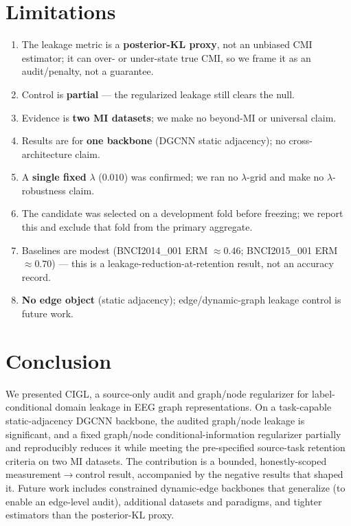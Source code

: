 \section{Limitations}

\begin{enumerate}
  \item The leakage metric is a \textbf{posterior-KL proxy}, not an unbiased CMI estimator; it can over- or
  under-state true CMI, so we frame it as an audit/penalty, not a guarantee.
  \item Control is \textbf{partial} --- the regularized leakage still clears the null.
  \item Evidence is \textbf{two MI datasets}; we make no beyond-MI or universal claim.
  \item Results are for \textbf{one backbone} (DGCNN static adjacency); no cross-architecture claim.
  \item A \textbf{single fixed} $\lambda$ ($0.010$) was confirmed; we ran no $\lambda$-grid and make no
  $\lambda$-robustness claim.
  \item The candidate was selected on a development fold before freezing; we report this and exclude that
  fold from the primary aggregate.
  \item Baselines are modest (BNCI2014\_001 ERM $\approx 0.46$; BNCI2015\_001 ERM $\approx 0.70$) --- this is
  a leakage-reduction-at-retention result, not an accuracy record.
  \item \textbf{No edge object} (static adjacency); edge/dynamic-graph leakage control is future work.
\end{enumerate}

\section{Conclusion}

We presented CIGL, a source-only audit and graph/node regularizer for label-conditional domain leakage in
EEG graph representations. On a task-capable static-adjacency DGCNN backbone, the audited graph/node leakage
is significant, and a fixed graph/node conditional-information regularizer partially and reproducibly
reduces it while meeting the pre-specified source-task retention criteria on two MI datasets. The
contribution is a bounded, honestly-scoped measurement$\rightarrow$control result, accompanied by the
negative results that shaped it. Future work includes constrained dynamic-edge backbones that generalize (to
enable an edge-level audit), additional datasets and paradigms, and tighter estimators than the posterior-KL
proxy.

